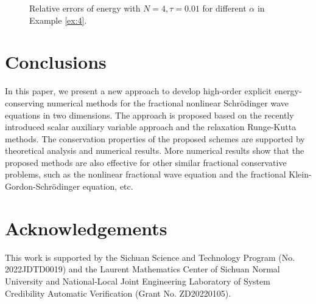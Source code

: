 \documentclass[preprint,compress,3p,10pt,fleqn]{elsarticle}
\numberwithin{equation}{section}
\begin{document}
\begin{figure}[H]
\begin{center}
{%
}\caption{ Relative errors of energy with $N=4, \tau=0.01$ for different $\alpha$ in Example \ref{ex:4}.}
\label{fig:3-5}
\end{center}
\end{figure}
	
\section{Conclusions}\label{Section 7}
In this paper, we present a new approach to develop high-order explicit energy-conserving numerical methods
for the fractional nonlinear Schr{\"o}dinger wave equations in two dimensions. The approach is proposed based on
the recently introduced scalar auxiliary variable approach and the relaxation Runge-Kutta methods. The conservation
properties of the proposed schemes are supported by theoretical analysis and numerical results.
More numerical results show that the proposed methods are also effective for other similar fractional conservative
problems, such as the nonlinear fractional wave equation and the fractional Klein-Gordon-Schr{\"o}dinger equation, etc.

\section*{Acknowledgements}
This work is supported by the Sichuan Science and Technology Program (No. 2022JDTD0019) and the Laurent Mathematics Center of Sichuan Normal University and National-Local Joint Engineering Laboratory of System Credibility Automatic Verification (Grant No. ZD20220105).	
	
\end{document}
